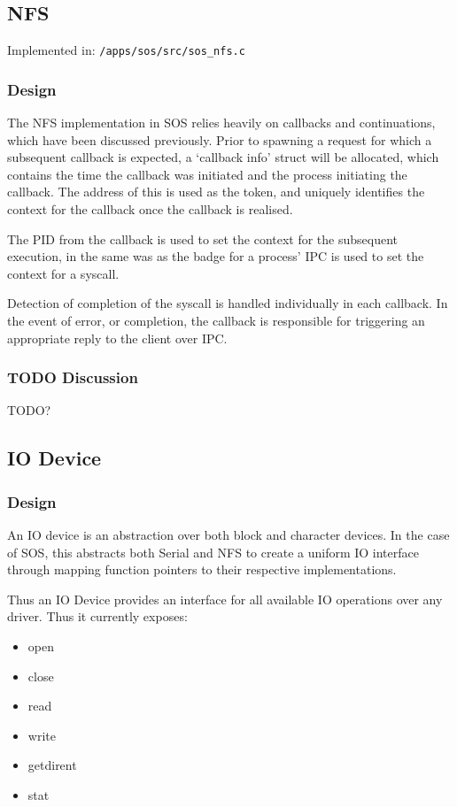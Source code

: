 \documentclass[a4paper,12pt]{article}
\begin{document}
\subsection{NFS}
Implemented in: \texttt{/apps/sos/src/sos\_nfs.c}

\subsubsection{Design}
The NFS implementation in SOS relies heavily on callbacks and continuations,
which have been discussed previously.  Prior to spawning a request for which a
subsequent callback is expected, a `callback info' struct will be allocated,
which contains the time the callback was initiated and the process initiating
the callback.  The address of this is used as the token, and uniquely
identifies the context for the callback once the callback is realised.

The PID from the callback is used to set the context for the subsequent
execution, in the same was as the badge for a process' IPC is used to set the
context for a syscall.

Detection of completion of the syscall is handled individually in each
callback.  In the event of error, or completion, the callback is responsible
for triggering an appropriate reply to the client over IPC.

\subsubsection{TODO Discussion}
TODO?

\subsection{IO Device}
\subsubsection{Design}
An IO device is an abstraction over both block and character devices.  In the
case of SOS, this abstracts both Serial and NFS to create a uniform IO
interface through mapping function pointers to their respective
implementations.

Thus an IO Device provides an interface for all available IO operations over
any driver.  Thus it currently exposes:

\begin{itemize}
\item open
\item close
\item read
\item write
\item getdirent
\item stat
\end{itemize}
\end{document}
